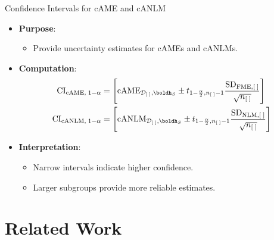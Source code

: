 \documentclass[11pt,compress,t,notes=noshow, aspectratio=169, xcolor=table]{beamer}
\begin{document}
\begin{frame}{Confidence Intervals for cAME and cANLM}
\begin{itemize}
\item \textbf{Purpose}:
\begin{itemize}
\item Provide uncertainty estimates for cAMEs and cANLMs.
\end{itemize}
\item \textbf{Computation}:
\begin{align*}
\text{CI}_{\text{cAME}, \; 1 - \alpha} &= \left[\text{cAME}_{\mathcal{D}_{[\;]}, \boldh_S} \pm t_{1-\frac{\alpha}{2}, n_{[\;]}-1} \frac{\text{SD}_{\text{FME}, [\;]}}{\sqrt{n_{[\;]}}} \right] \\
\text{CI}_{\text{cANLM}, \; 1 - \alpha} &= \left[\text{cANLM}_{\mathcal{D}_{[\;]}, \boldh_S} \pm t_{1-\frac{\alpha}{2}, n_{[\;]}-1} \frac{\text{SD}_{\text{NLM}, [\;]}}{\sqrt{n_{[\;]}}} \right]
\end{align*}
\item \textbf{Interpretation}:
\begin{itemize}
\item Narrow intervals indicate higher confidence.
\item Larger subgroups provide more reliable estimates.
\end{itemize}
\end{itemize}
\end{frame}

\section{Related Work}
\end{document}

